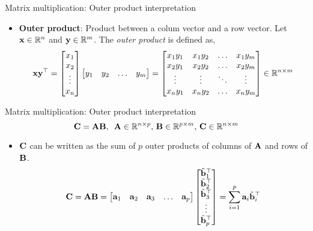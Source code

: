 \documentclass[aspectratio=169]{beamer}
\let\olditem\item
\renewcommand{\item}{\setlength{\itemsep}{\fill}\olditem}
\def\mf{\ensuremath\mathbf}
\def\mb{\ensuremath\mathbb}
\begin{document}
\begin{frame}[t]{Matrix multiplication: Outer product interpretation}
\begin{itemize}
    \item \textbf{Outer product}: Product between a colum vector and a row vector. Let $\mf{x} \in \mathbb{R}^n$ and $\mf{y} \in \mathbb{R}^m$. The \textit{outer product} is defined as,
    \[ \mf{x}\mf{y}^{\top} = \begin{bmatrix}
    x_1\\ x_2\\ \vdots \\x_n
    \end{bmatrix} \begin{bmatrix}
    y_1 &  y_2 & \ldots & y_m
    \end{bmatrix} = \begin{bmatrix}
    x_1y_1 &  x_1y_2 & \ldots & x_1y_m \\
    x_2y_1 &  x_2y_2 & \ldots & x_2y_m \\
    \vdots &  \vdots & \ddots & \vdots \\
    x_ny_1 &  x_ny_2 & \ldots & x_ny_m \\
    \end{bmatrix} \in \mb{R}^{n \times m} \]
\end{itemize}
\end{frame}


\begin{frame}[t]{Matrix multiplication: Outer product interpretation}
\[ \mf{C} = \mf{A}\mf{B}, \,\,\, \mf{A} \in \mathbb{R}^{n \times p}, \, \mf{B} \in \mathbb{R}^{p \times m}, \, \mf{C} \in \mathbb{R}^{n \times m} \]
\begin{itemize}
    \item $\mf{C}$ can be written as the sum of $p$ outer products of columns of $\mf{A}$ and rows of $\mf{B}$.
    \[ \mf{C} = \mf{A}\mf{B} = \begin{bmatrix}
    \mf{a}_1 & \mf{a}_2 & \mf{a}_3 & \ldots & \mf{a}_p
    \end{bmatrix} \begin{bmatrix}
    \tilde{\mf{b}}_1^{\top} \\
    \tilde{\mf{b}}_2^{\top} \\
    \tilde{\mf{b}}_3^{\top} \\
    \vdots \\
    \tilde{\mf{b}}_p^{\top}
    \end{bmatrix} = \sum_{i=1}^{p}\mf{a}_i\tilde{\mf{b}}_i^{\top} \]
\end{itemize}
\end{frame}
\end{document}
